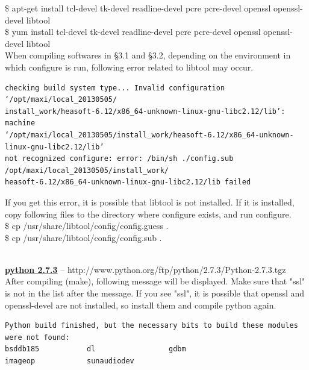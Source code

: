\documentclass[10pt]{report}
\renewcommand{\_}{\textscale{.5}{\textbf{\textunderscore}}}
\begin{document}
\noindent \$ apt-get install tcl-devel tk-devel readline-devel pcre pcre-devel openssl openssl-devel libtool\\
\$ yum install tcl-devel tk-devel readline-devel pcre pcre-devel openssl openssl-devel libtool\\

When compiling softwares in \S3.1 and \S3.2, depending on the environment in which configure is run, following error related to libtool may occur. \\

\begin{lstlisting}
checking build system type... Invalid configuration ‘/opt/maxi/local_20130505/
install_work/heasoft-6.12/x86_64-unknown-linux-gnu-libc2.12/lib’: machine
‘/opt/maxi/local_20130505/install_work/heasoft-6.12/x86_64-unknown-linux-gnu-libc2.12/lib’
not recognized configure: error: /bin/sh ./config.sub /opt/maxi/local_20130505/install_work/
heasoft-6.12/x86_64-unknown-linux-gnu-libc2.12/lib failed
\end{lstlisting}

\noindent If you get this error, it is possible that libtool is not installed. If it is installed, copy following files to the directory where configure exists, and run configure.\\

\noindent \$ cp /usr/share/libtool/config/config.guess .\\
\$ cp /usr/share/libtool/config/config.sub .\\

\

\noindent\underline{\textbf{python 2.7.3}} -- http://www.python.org/ftp/python/2.7.3/Python-2.7.3.tgz\\

\noindent After compiling (make), following message will be displayed. Make sure that "\_ssl" is not in the list after the message. If you see "\_ssl", it is possible that openssl and openssl-devel are not installed, so install them and compile python again. \\

\begin{lstlisting}[columns=fixed]
Python build finished, but the necessary bits to build these modules were not found:
bsddb185           dl                 gdbm
imageop            sunaudiodev
\end{lstlisting}
\end{document}
